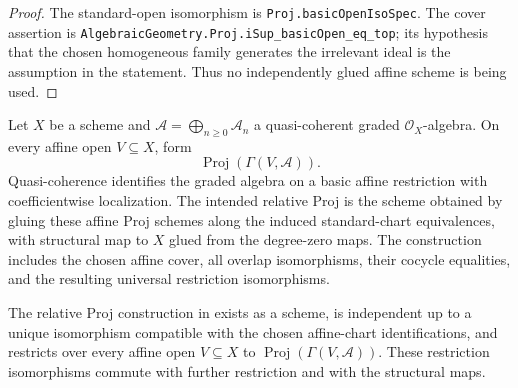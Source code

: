 \begin{proof}
  The standard-open isomorphism is \texttt{Proj.basicOpenIsoSpec}.
  The cover assertion is
  \texttt{AlgebraicGeometry.Proj.iSup\_basicOpen\_eq\_top}; its hypothesis
  that the chosen homogeneous family generates the irrelevant ideal is the
  assumption in the statement.
  Thus no independently glued affine scheme is being used.
\end{proof}

\begin{definition}
  \label{def:nagata-relative-proj}

  Let $X$ be a scheme and
  $\mathcal A=\bigoplus_{n\geq0}\mathcal A_n$ a quasi-coherent graded
  $\mathcal O_X$-algebra.  On every affine open $V\subseteq X$, form
  \[
    \operatorname{Proj}(\Gamma(V,\mathcal A)).
  \]
  Quasi-coherence identifies the graded algebra on a basic affine restriction
  with coefficientwise localization.  The intended relative Proj is the scheme
  obtained by gluing these affine Proj schemes along the induced standard-chart
  equivalences, with structural map to $X$ glued from the degree-zero maps.
  The construction includes the chosen affine cover, all overlap
  isomorphisms, their cocycle equalities, and the resulting universal
  restriction isomorphisms.
\end{definition}

\begin{lemma}
  \label{lemma:nagata-relative-proj-exists}

  The relative Proj construction in
   exists as a scheme, is independent up to a
  unique isomorphism compatible with the chosen affine-chart
  identifications, and restricts over every affine open $V\subseteq X$ to
  $\operatorname{Proj}(\Gamma(V,\mathcal A))$.  These restriction
  isomorphisms commute with further restriction and with the structural maps.
\end{lemma}

